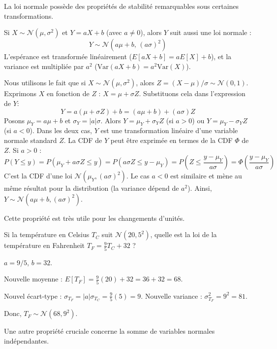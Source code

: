 La loi normale possède des propriétés de stabilité remarquables sous certaines transformations.

\begin{theorembox}
Si $X \sim \mathcal{N}(\mu, \sigma^2)$ et $Y = aX + b$ (avec $a \neq 0$), alors $Y$ suit aussi une loi normale :
$$ Y \sim \mathcal{N}(a\mu + b, \, (a\sigma)^2) $$
L'espérance est transformée linéairement ($E[aX+b] = aE[X]+b$), et la variance est multipliée par $a^2$ ($\text{Var}(aX+b) = a^2\text{Var}(X)$).
\end{theorembox}

\begin{proofbox}
Nous utilisons le fait que si $X \sim \mathcal{N}(\mu, \sigma^2)$, alors $Z = (X-\mu)/\sigma \sim \mathcal{N}(0,1)$.
Exprimons $X$ en fonction de $Z$ : $X = \mu + \sigma Z$.
Substituons cela dans l'expression de $Y$:
$$ Y = a(\mu + \sigma Z) + b = (a\mu + b) + (a\sigma)Z $$
Posons $\mu_Y = a\mu + b$ et $\sigma_Y = |a|\sigma$. Alors $Y = \mu_Y + \sigma_Y Z$ (si $a>0$) ou $Y = \mu_Y - \sigma_Y Z$ (si $a<0$).
Dans les deux cas, $Y$ est une transformation linéaire d'une variable normale standard $Z$.
La CDF de $Y$ peut être exprimée en termes de la CDF $\Phi$ de $Z$.
Si $a>0$ :
$$ P(Y \le y) = P(\mu_Y + a\sigma Z \le y) = P(a\sigma Z \le y - \mu_Y) = P\left( Z \le \frac{y - \mu_Y}{a\sigma} \right) = \Phi\left(\frac{y - \mu_Y}{a\sigma}\right) $$
C'est la CDF d'une loi $\mathcal{N}(\mu_Y, (a\sigma)^2)$.
Le cas $a<0$ est similaire et mène au même résultat pour la distribution (la variance dépend de $a^2$).
Ainsi, $Y \sim \mathcal{N}(a\mu + b, (a\sigma)^2)$.
\end{proofbox}

Cette propriété est très utile pour les changements d'unités.

\begin{examplebox}
Si la température en Celsius $T_C$ suit $\mathcal{N}(20, 5^2)$, quelle est la loi de la température en Fahrenheit $T_F = \frac{9}{5}T_C + 32$ ?

$a = 9/5$, $b=32$.

Nouvelle moyenne : $E[T_F] = \frac{9}{5}(20) + 32 = 36 + 32 = 68$.

Nouvel écart-type : $\sigma_{T_F} = |a|\sigma_{T_C} = \frac{9}{5}(5) = 9$. Nouvelle variance : $\sigma_{T_F}^2 = 9^2 = 81$.

Donc, $T_F \sim \mathcal{N}(68, 9^2)$.
\end{examplebox}

Une autre propriété cruciale concerne la somme de variables normales indépendantes.

